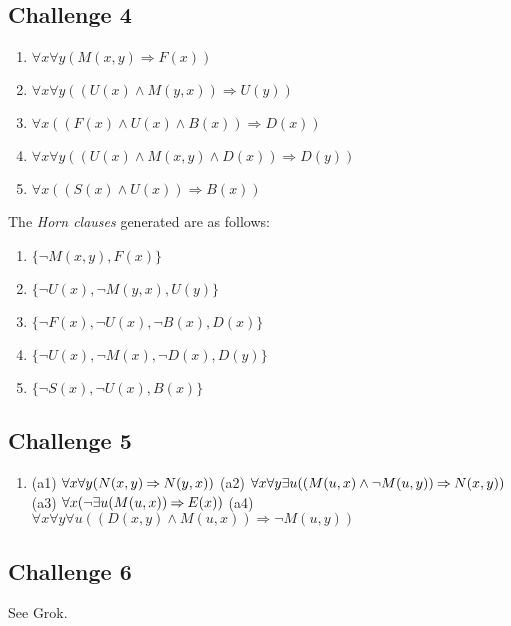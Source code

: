 \documentclass[12pt]{article}
\newcommand{\impl}{\mathbin{\Rightarrow}}
\begin{document}
\subsection*{Challenge 4}
\begin{enumerate}
  \item $\forall x \forall y(M(x,y) \impl F(x))$
  \item $\forall x \forall y((U(x) \land M(y,x)) \impl U(y))$
  \item $\forall x((F(x) \land U(x) \land B(x)) \impl D(x))$
  \item $\forall x \forall y((U(x) \land M(x,y) \land D(x)) \impl D(y))$
  \item $\forall x((S(x) \land U(x)) \impl B(x))$
\end{enumerate}

\bigskip
\noindent
The \emph{Horn clauses} generated are as follows:
\begin{enumerate}
  \item $\{\neg M(x,y), F(x)\}$
  \item $\{\neg U(x), \neg M(y,x), U(y)\}$
  \item $\{\neg F(x), \neg U(x), \neg B(x), D(x)\}$
  \item $\{\neg U(x), \neg M(x), \neg D(x), D(y)\}$
  \item $\{\neg S(x), \neg U(x), B(x)\}$
\end{enumerate}

\subsection*{Challenge 5}

\begin{enumerate}
  \item (a1) $\forall x \forall y(N(x,y) \impl N(y,x))\\\\$
        (a2) $\forall x \forall y \exists u((M(u,x) \land \neg M(u,y)) \impl N(x,y))\\\\$
        (a3) $\forall x(\neg \exists u(M(u,x)) \impl E(x))\\\\$
        (a4) $\forall x \forall y \forall u((D(x,y) \land M(u,x)) \impl \neg M(u,y))$
\end{enumerate}


\subsection*{Challenge 6}
See Grok.
\end{document}
